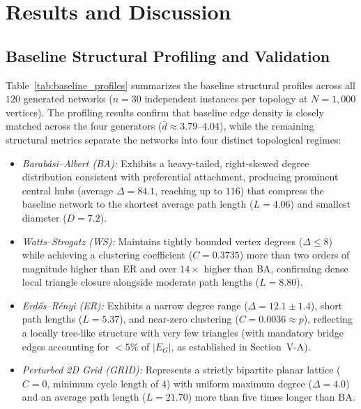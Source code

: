 \documentclass[conference]{IEEEtran}
\begin{document}
\section{Results and Discussion}

\subsection{Baseline Structural Profiling and Validation}

Table~\ref{tab:baseline_profiles} summarizes the baseline structural profiles across all $120$ generated networks ($n = 30$ independent instances per topology at $N = 1,000$ vertices). The profiling results confirm that baseline edge density is closely matched across the four generators ($\bar{d} \approx 3.79\text{--}4.04$), while the remaining structural metrics separate the networks into four distinct topological regimes:

\begin{itemize}
    \item \textit{Barab\'{a}si--Albert (BA):} Exhibits a heavy-tailed, right-skewed degree distribution consistent with preferential attachment, producing prominent central hubs (average $\Delta = 84.1$, reaching up to $116$) that compress the baseline network to the shortest average path length ($L = 4.06$) and smallest diameter ($D = 7.2$).
    \item \textit{Watts--Strogatz (WS):} Maintains tightly bounded vertex degrees ($\Delta \le 8$) while achieving a clustering coefficient ($C = 0.3735$) more than two orders of magnitude higher than ER and over $14\times$ higher than BA, confirming dense local triangle closure alongside moderate path lengths ($L = 8.80$).
    \item \textit{Erd\H{o}s--R\'{e}nyi (ER):} Exhibits a narrow degree range ($\Delta = 12.1 \pm 1.4$), short path lengths ($L = 5.37$), and near-zero clustering ($C = 0.0036 \approx p$), reflecting a locally tree-like structure with very few triangles (with mandatory bridge edges accounting for $< 5\%$ of $|E_G|$, as established in Section~V-A).
    \item \textit{Perturbed 2D Grid (GRID):} Represents a strictly bipartite planar lattice ($C = 0$, minimum cycle length of $4$) with uniform maximum degree ($\Delta = 4.0$) and an average path length ($L = 21.70$) more than five times longer than BA.
\end{itemize}
\end{document}
